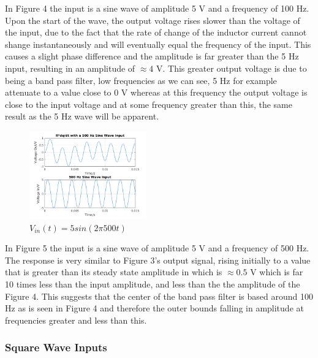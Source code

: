 \documentclass[11pt,a4paper]{article}
\begin{document}
\vspace{6mm}In Figure 4 the input is a sine wave of amplitude 5 V and a frequency of 100 Hz. Upon the start of the wave, the output voltage rises slower than the voltage of the input, due to the fact that the rate of change of the inductor current cannot shange instantaneously and will eventually equal the frequency of the input. This causes a slight phase difference and the amplitude is far greater than the 5 Hz input, resulting in an amplitude of $\approx 4$ V. This greater output voltage is due to being a band pass filter, low frequencies as we can see, 5 Hz for example attenuate to a value close to 0 V whereas at this frequency the output voltage is close to the input voltage and at some frequency greater than this, the same result as the 5 Hz wave will be apparent.

\begin{figure}
    \vspace{-33mm}
  		\includegraphics[width=0.45\textwidth]{Ex3_Figs/500Sine.png}
	\vspace{-6mm}
  	\caption{$V_{in}(t)= 5sin(2 \pi 500t)$}
  	\label{fig:ex3g4}
\end{figure}

\vspace{2mm}In Figure 5 the input is a sine wave of amplitude 5 V and a frequency of 500 Hz. The response is very similar to Figure 3's output signal, rising initially to a value that is greater than its steady state amplitude in which is $\approx 0.5$ V which is far 10 times less than the input amplitude, and less than the the amplitude of the Figure 4. This suggests that the center of the band pass filter is based around 100 Hz as is seen in Figure 4 and therefore the outer bounds falling in amplitude at frequencies greater and less than this.

\subsubsection{Square Wave Inputs}
\end{document}
